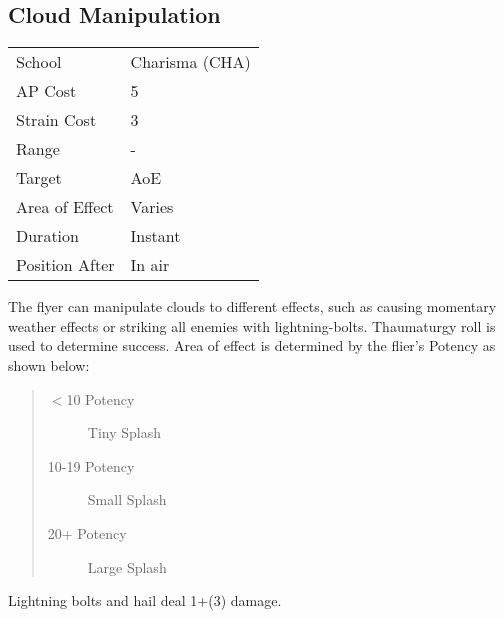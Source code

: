 \documentclass[11pt,a4paper,twocolumn]{book}
\begin{document}
\subsection*{Cloud Manipulation}
{
	\begin{tabu} to 75mm{| X[l,4] | X[l,7] |}
		\hline
		School 			& Charisma (CHA) 	\\
		AP Cost	      	& 5 				\\
		Strain Cost     & 3 				\\
		Range     		& - 				\\
		Target      	& AoE 				\\
		Area of Effect  & Varies 			\\
		Duration     	& Instant 			\\
		Position After  & In air 			\\ \hline
	\end{tabu}
	
}

\medskip
The flyer can manipulate clouds to different effects, such as causing momentary weather effects or striking all enemies with lightning-bolts. Thaumaturgy roll is used to determine success. Area of effect is determined by the flier's Potency as shown below: 

%
\begin{quote}
	\begin{description}
		\item[$<$10 Potency] 	Tiny Splash
		\item[10-19 Potency] 	Small Splash
		\item[20+ Potency] 	Large Splash
	\end{description}
\end{quote}

\noindent
Lightning bolts and hail deal 1+(3) damage.

\medskip
\end{document}
